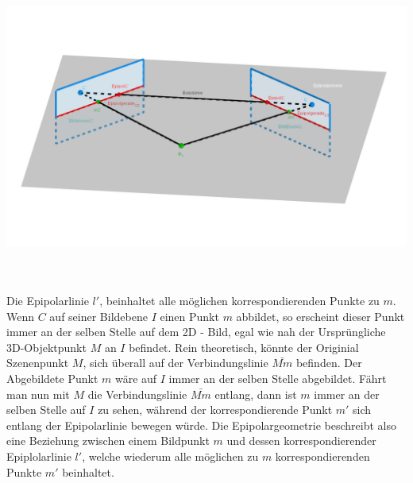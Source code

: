 \begin{minipage}{\linewidth}
	\centering
	\includegraphics[width=1.\linewidth]{images/EpipolarGeoemtrieGrafik.png}
\end{minipage}\\ \\


Die Epipolarlinie $l'$, beinhaltet alle möglichen korrespondierenden Punkte zu $m$. Wenn $C$ auf seiner Bildebene $I$ einen Punkt $m$ abbildet, so erscheint dieser Punkt immer an der selben Stelle auf dem 2D - Bild, egal wie nah der Ursprüngliche 3D-Objektpunkt $M$ an $I$ befindet. Rein theoretisch, könnte der Originial Szenenpunkt $M$, sich überall auf der Verbindungslinie $\bar{Mm}$ befinden. Der Abgebildete Punkt $m$ wäre auf $I$ immer an der selben Stelle abgebildet. Fährt man nun mit $M$ die Verbindungslinie $\bar{Mm}$ entlang, dann ist $m$ immer an der selben Stelle auf $I$ zu sehen, während der korrespondierende Punkt $m'$ sich entlang der Epipolarlinie bewegen würde. Die Epipolargeometrie beschreibt also eine Beziehung zwischen einem Bildpunkt $m$ und dessen korrespondierender Epiplolarlinie $l'$, welche wiederum alle möglichen zu $m$ korrespondierenden Punkte $m'$ beinhaltet\cite{HZ,Zhang2014,ZZGXr}.\\



